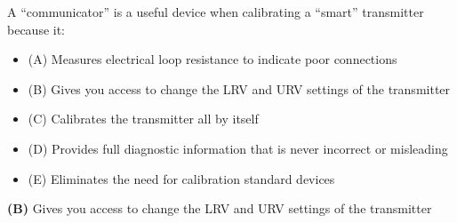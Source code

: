 

A ``communicator'' is a useful device when calibrating a ``smart'' transmitter because it:

\begin{itemize}
\item{(A)} Measures electrical loop resistance to indicate poor connections
\vskip 5pt 
\item{(B)} Gives you access to change the LRV and URV settings of the transmitter
\vskip 5pt 
\item{(C)} Calibrates the transmitter all by itself
\vskip 5pt 
\item{(D)} Provides full diagnostic information that is never incorrect or misleading
\vskip 5pt 
\item{(E)} Eliminates the need for calibration standard devices
\end{itemize}







{\bf (B)} Gives you access to change the LRV and URV settings of the transmitter
 









